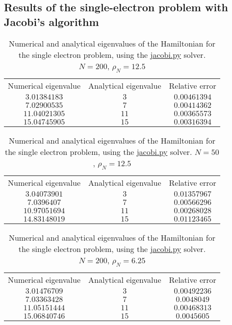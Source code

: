 \documentclass[english,notitlepage,reprint]{revtex4-1}  %
\begin{document}
\subsection{Results of the single-electron problem with Jacobi's algorithm}\label{subsec:43}
\begin{table}[H]
	\label{tab:431}
	\centering
	\begin{tabular}{|c|c|c|}
	Numerical eigenvalue & Analytical eigenvalue & Relative error \\
	\(3.01384183\)	& \(3\) & \(0.00461394\) \\
	\(7.02900535\) & \(7\) & \(0.00414362\) \\
	\(11.04021305\) & \(11\) & \(0.00365573\) \\
	\(15.04745905\) & \(15\) & \(0.00316394\) \\
	\end{tabular}
	\caption{Numerical and analytical eigenvalues of the Hamiltonian for
	the single electron problem, using the \hyperref[A:2]{jacobi.py} solver. \(N=200\),
	\(\rho_{N}=12.5\)}
\end{table}
\begin{table}[H]
	\label{tab:432}
	\centering
	\begin{tabular}{|c|c|c|}
	Numerical eigenvalue & Analytical eigenvalue & Relative error \\
	\(3.04073901\)	& \(3\) & \(0.01357967\) \\
	\(7.0396407\) & \(7\) & \(0.00566296\) \\
	\(10.97051694\) & \(11\) & \(0.00268028\) \\
	\(14.83148019\) & \(15\) & \(0.01123465\) \\
	\end{tabular}
	\caption{Numerical and analytical eigenvalues of the Hamiltonian for
	the single electron problem, using the \hyperref[A:2]{jacobi.py} solver. \(N=50\),
	\(\rho_{N}=12.5\)}
\end{table}
\begin{table}[H]
	\label{tab:433}
	\centering
	\begin{tabular}{|c|c|c|}
	Numerical eigenvalue & Analytical eigenvalue & Relative error \\
	\(3.01476709\)	& \(3\) & \(0.00492236\) \\
	\(7.03363428\) & \(7\) & \(0.0048049\) \\
	\(11.05151444\) & \(11\) & \(0.00468313\) \\
	\(15.06840746\) & \(15\) & \(0.0045605\) \\
	\end{tabular}
	\caption{Numerical and analytical eigenvalues of the Hamiltonian for
	the single electron problem, using the \hyperref[A:2]{jacobi.py} solver. \(N=200\),
	\(\rho_{N}=6.25\)}
\end{table}
\end{document}
